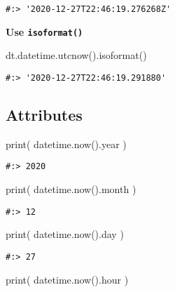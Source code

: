 \documentclass[
]{book}
\newenvironment{Shaded}{\begin{snugshade}}{\end{snugshade}}
\newcommand{\BuiltInTok}[1]{#1}
\newcommand{\NormalTok}[1]{#1}
\begin{document}
\begin{verbatim}
#:> '2020-12-27T22:46:19.276268Z'
\end{verbatim}

\textbf{Use \texttt{isoformat()}}

\begin{Shaded}
\begin{Highlighting}[]
\NormalTok{dt.datetime.utcnow().isoformat()}
\end{Highlighting}
\end{Shaded}

\begin{verbatim}
#:> '2020-12-27T22:46:19.291880'
\end{verbatim}

\hypertarget{attributes-1}{%
\subsection{Attributes}\label{attributes-1}}

\begin{Shaded}
\begin{Highlighting}[]
\BuiltInTok{print}\NormalTok{( datetime.now().year )}
\end{Highlighting}
\end{Shaded}

\begin{verbatim}
#:> 2020
\end{verbatim}

\begin{Shaded}
\begin{Highlighting}[]
\BuiltInTok{print}\NormalTok{( datetime.now().month )}
\end{Highlighting}
\end{Shaded}

\begin{verbatim}
#:> 12
\end{verbatim}

\begin{Shaded}
\begin{Highlighting}[]
\BuiltInTok{print}\NormalTok{( datetime.now().day )}
\end{Highlighting}
\end{Shaded}

\begin{verbatim}
#:> 27
\end{verbatim}

\begin{Shaded}
\begin{Highlighting}[]
\BuiltInTok{print}\NormalTok{( datetime.now().hour )}
\end{Highlighting}
\end{Shaded}
\end{document}
